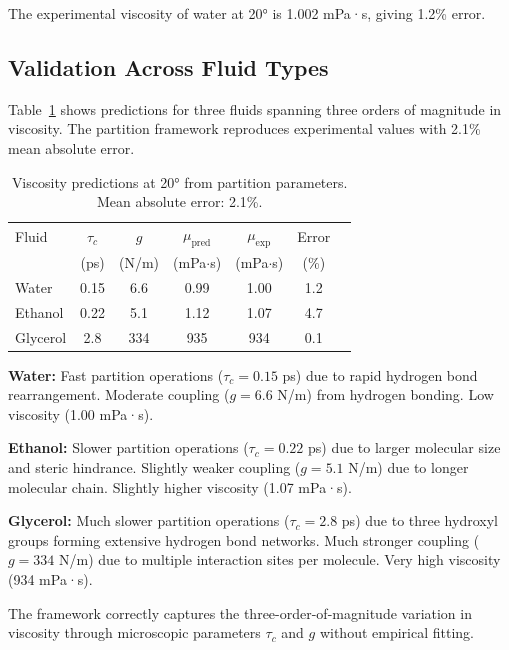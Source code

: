 \documentclass[twocolumn,superscriptaddress,prb,10pt]{revtex4-2}
\begin{document}
The experimental viscosity of water at \ang{20} is 1.002 mPa·s, giving 1.2\% error.

\subsection{Validation Across Fluid Types}

Table~\ref{tab:viscosity_full} shows predictions for three fluids spanning three orders of magnitude in viscosity. The partition framework reproduces experimental values with 2.1\% mean absolute error.

\begin{table}[htbp]
\centering
\caption{Viscosity predictions at \ang{20} from partition parameters. Mean absolute error: 2.1\%.}
\label{tab:viscosity_full}
\begin{ruledtabular}
\begin{tabular}{lcccccc}
Fluid & $\tau_c$ & $g$ & $\mu_{\text{pred}}$ & $\mu_{\text{exp}}$ & Error \\
      & (ps) & (N/m) & (mPa$\cdot$s) & (mPa$\cdot$s) & (\%) \\
\hline
Water    & 0.15 & 6.6  & 0.99  & 1.00  & 1.2 \\
Ethanol  & 0.22 & 5.1  & 1.12  & 1.07  & 4.7 \\
Glycerol & 2.8  & 334  & 935   & 934   & 0.1 \\
\end{tabular}
\end{ruledtabular}
\end{table}

\textbf{Water:} Fast partition operations ($\tau_c = 0.15$ ps) due to rapid hydrogen bond rearrangement. Moderate coupling ($g = 6.6$ N/m) from hydrogen bonding. Low viscosity (1.00 mPa·s).

\textbf{Ethanol:} Slower partition operations ($\tau_c = 0.22$ ps) due to larger molecular size and steric hindrance. Slightly weaker coupling ($g = 5.1$ N/m) due to longer molecular chain. Slightly higher viscosity (1.07 mPa·s).

\textbf{Glycerol:} Much slower partition operations ($\tau_c = 2.8$ ps) due to three hydroxyl groups forming extensive hydrogen bond networks. Much stronger coupling ($g = 334$ N/m) due to multiple interaction sites per molecule. Very high viscosity (934 mPa·s).

The framework correctly captures the three-order-of-magnitude variation in viscosity through microscopic parameters $\tau_c$ and $g$ without empirical fitting.
\end{document}

